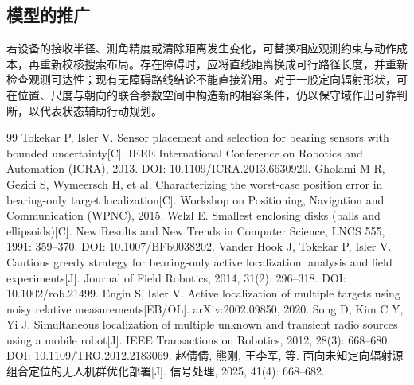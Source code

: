 \documentclass[UTF8,a4paper,zihao=-4,fontset=none]{ctexart}
\begin{document}
\subsection{模型的推广}

若设备的接收半径、测角精度或清除距离发生变化，可替换相应观测约束与动作成本，再重新校核搜索布局。存在障碍时，应将直线距离换成可行路径长度，并重新检查观测可达性；现有无障碍路线结论不能直接沿用。对于一般定向辐射形状，可在位置、尺度与朝向的联合参数空间中构造新的相容条件，仍以保守域作出可靠判断，以代表状态辅助行动规划。

\clearpage
\begin{thebibliography}{99}
   Tokekar P, Isler V. Sensor placement and selection for bearing sensors with bounded uncertainty[C]. IEEE International Conference on Robotics and Automation (ICRA), 2013. DOI: 10.1109/ICRA.2013.6630920.
   Gholami M R, Gezici S, Wymeersch H, et al. Characterizing the worst-case position error in bearing-only target localization[C]. Workshop on Positioning, Navigation and Communication (WPNC), 2015.
   Welzl E. Smallest enclosing disks (balls and ellipsoids)[C]. New Results and New Trends in Computer Science, LNCS 555, 1991: 359--370. DOI: 10.1007/BFb0038202.
   Vander Hook J, Tokekar P, Isler V. Cautious greedy strategy for bearing-only active localization: analysis and field experiments[J]. Journal of Field Robotics, 2014, 31(2): 296--318. DOI: 10.1002/rob.21499.
   Engin S, Isler V. Active localization of multiple targets using noisy relative measurements[EB/OL]. arXiv:2002.09850, 2020.
   Song D, Kim C Y, Yi J. Simultaneous localization of multiple unknown and transient radio sources using a mobile robot[J]. IEEE Transactions on Robotics, 2012, 28(3): 668--680. DOI: 10.1109/TRO.2012.2183069.
   赵倩倩, 熊刚, 王李军, 等. 面向未知定向辐射源组合定位的无人机群优化部署[J]. 信号处理, 2025, 41(4): 668--682.
\end{thebibliography}
\end{document}

